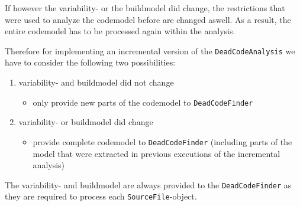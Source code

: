 \documentclass[a4paper]{article}
\begin{document}
If however the variability- or the buildmodel did change, the restrictions that were used to analyze the codemodel before are changed aswell. As a result, the entire codemodel has to be processed again within the analysis.

Therefore for implementing an incremental version of the \texttt{DeadCodeAnalysis} we have to consider the following two possibilities:

\begin{enumerate}
 \item variability- and buildmodel did not change
 \begin{itemize}
 	\item only provide new parts of the codemodel to \texttt{DeadCodeFinder}
 \end{itemize}
  \item variability- or buildmodel did change
 \begin{itemize}
 	\item provide complete codemodel to \texttt{DeadCodeFinder} (including parts of the model that were extracted in previous executions of the incremental analysis)
 \end{itemize}
\end{enumerate}

The variability- and buildmodel are always provided to the \texttt{DeadCodeFinder} as they are required to process each \texttt{SourceFile}-object.



\newpage


\end{document}
